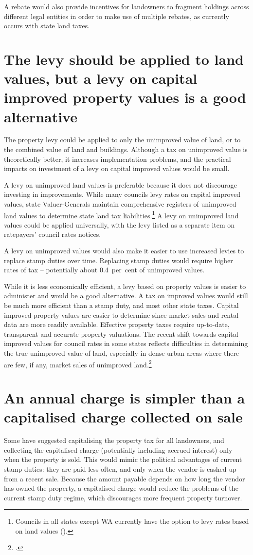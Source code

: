 \documentclass[twoside,english]{Dianab5ona4portrait}
\begin{document}
A rebate would also provide incentives for landowners to fragment holdings across different legal entities in order to make use of multiple rebates, as currently occurs with state land taxes.

\section{\label{sec:PROP-6-3}The levy should be applied to land values, but a levy on capital improved property values is a good alternative}
The property levy could be applied to only the unimproved value of land, or to the combined value of land and buildings. Although a tax on unimproved value is theoretically better, it increases implementation problems, and the practical impacts on investment of a levy on capital improved values would be small. 

A levy on unimproved land values is preferable because it does not discourage investing in improvements. While many councils levy rates on capital improved values, state Valuer-Generals maintain comprehensive registers of unimproved land values to determine state land tax liabilities.\footnote{Councils in all states except WA currently have the option to levy rates based on land values ().}  A levy on unimproved land values could be applied universally, with the levy listed as a separate item on ratepayers’ council rates notices.

A levy on unimproved values would also make it easier to use increased levies to replace stamp duties over time. Replacing stamp duties would require higher rates of tax – potentially about 0.4~per~cent of unimproved values. 

While it is less economically efficient, a levy based on property values is easier to administer and would be a good alternative. A tax on improved values would still be much more efficient than a stamp duty, and most other state taxes. Capital improved property values are easier to determine since market sales and rental data are more readily available. Effective property taxes require up-to-date, transparent and accurate property valuations. The recent shift towards capital improved values for council rates in some states reflects difficulties in determining the true unimproved value of land, especially in dense urban areas where there are few, if any, market sales of unimproved land.\footcites[][24]{Ombudsman2005}[][153]{HefferanBoyd2010}

\section{\label{sec:PROP-6-4}An annual charge is simpler than a capitalised charge collected on sale}
Some have suggested capitalising the property tax for all landowners, and collecting the capitalised charge (potentially including accrued interest) only when the property is sold.  This would mimic the political advantages of current stamp duties: they are paid less often, and only when the vendor is cashed up from a recent sale. Because the amount payable depends on how long the vendor has owned the property, a capitalised charge would reduce the problems of the current stamp duty regime, which discourages more frequent property turnover.
\end{document}
